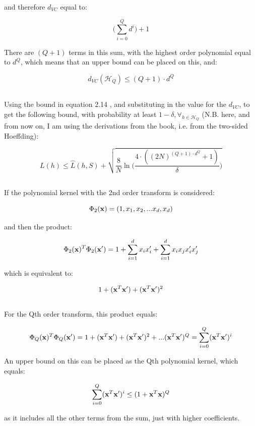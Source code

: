 \documentclass{scrartcl}
\begin{document}
and therefore $d_{VC}$ equal to:

\[ \big( \sum^Q_{i=0} d^i \big) + 1 \]

There are $(Q+1)$ terms in this sum, with the highest order polynomial equal to $d^Q$, which means that an upper bound can be placed on this, and:

\[ d_{VC} (\mathcal{H}_Q) \leq (Q + 1) \cdot d^Q  \]

\subsection{}
Using the bound in equation 2.14 \cite[p. 58]{abu}, and substituting in the value for the $d_{VC}$, to get the following bound, with probability at least $1 - \delta, \forall_{h \in \mathcal{H}_Q}$ (N.B. here, and from now on, I am using the derivations from the book, i.e. from the two-sided Hoeffding):

\[
    L(h) \leq \hat{L} (h, S) + \sqrt { \frac {8} {N} \ln \bigg( \frac {4 \cdot ( (2N)^{(Q + 1) \cdot d^Q} + 1) } {\delta} \bigg) }
\]

\subsection{}

If the polynomial kernel with the 2nd order transform is considered:

\[ \Phi_2({\mathbf x}) = (1, x_1, x_2, ... x_d, x_d) \]

and then the product:

\[ \Phi_2({\mathbf x})^T \Phi_2({\mathbf x}') = 1 + \sum^d_{i=1} x_ix_i' + \sum^d_{i=1} x_ix_jx_i'x_j' \]

which is equivalent to:

\[ 1 + ({\mathbf x}^T {\mathbf x}') + ({\mathbf x}^T {\mathbf x}')^2 \] \cite[p. 8-34]{abu} \\

For the Qth order transform, this product equals:

\[ \Phi_Q({\mathbf x})^T\Phi_Q({\mathbf x}') = 1 + ({\mathbf x}^T {\mathbf x}') + ({\mathbf x}^T {\mathbf x}')^2 + ... ({\mathbf x}^T {\mathbf x}')^Q \\
= \sum_{i=0}^{Q} ({\mathbf x}^T {\mathbf x}')^i
\]

An upper bound on this can be placed as the Qth polynomial kernel, which equals:

\[ \sum_{i=0}^{Q} ({\mathbf x}^T {\mathbf x}')^i \leq (1 + {\mathbf x}^T {\mathbf x})^Q \]

as it includes all the other terms from the sum, just with higher coefficients.\\
\end{document}
